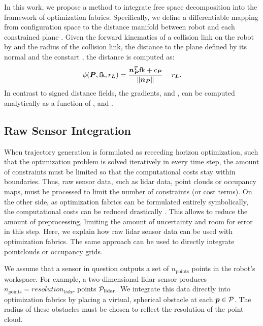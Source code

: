 In this work, we propose a method to integrate free space
decomposition into the framework of optimization \ac{fabrics}. Specifically, we
define a differentiable mapping from configuration space \Q{} to the distance
manifold between robot and each constrained plane \plane{}. Given the forward
kinematics of a collision link on the robot by \fk{} and the radius of the
collision link, the distance to the plane \plane{} defined by its normal
\np{} and the constart \cp{}, the distance is computed as:
\begin{equation}
  \phi({\bm{P},\textrm{fk},r_{\bm{L}}}) = \frac{\bm{n}_{\bm{P}}^T\textrm{fk} + c_{\bm{P}}}{\left\lVert\bm{n}_{\bm{P}}\right\rVert} - r_{\bm{L}}
  \label{eq:point_plane_distance}.
\end{equation}
In contrast to signed distance fields, the gradients, \J{} and \Jdot{}, can be
computed analytically as a function of \q{}, \np{} and \cp{}.



\subsection{Raw Sensor Integration}
\label{sub:raw_sensor_integration}


When trajectory generation is formulated as receeding horizon optimization, such
that the optimization problem is solved iteratively in every time step, the
amount of constraints must be limited so that the computational costs stay
within boundaries. Thus, raw sensor data, such as lidar data, point clouds or 
occupancy maps, must be processed to limit the number of constraints (or cost
terms). On the other side, as optimization \ac{fabrics} can be formulated entirely
symbolically, the computational costs can be reduced drastically
\cite{Spahn2023}. This allows to reduce the amount of preprocessing,
limiting the amount of uncertainty and room for error in this step. Here, we
explain how raw lidar sensor data can be used with optimization \ac{fabrics}.
The same approach can be used to directly integrate pointclouds or occupancy
grids.

We assume that a sensor in question outputs a set of $n_{\textrm{points}}$
points \pointcloud{} in the robot's workspace. For example, a two-dimensional
lidar sensor produces $n_{\textrm{points}}=resolution_{lidar}$ points
$\mathcal{P}_{\textrm{lidar}}$. We integrate this data directly into
optimization \ac{fabrics} by placing a virtual, spherical obstacle at each $\bm{p}
\in \mathcal{P}$. The radius of these obstacles must be chosen to reflect the
resolution of the point cloud.




